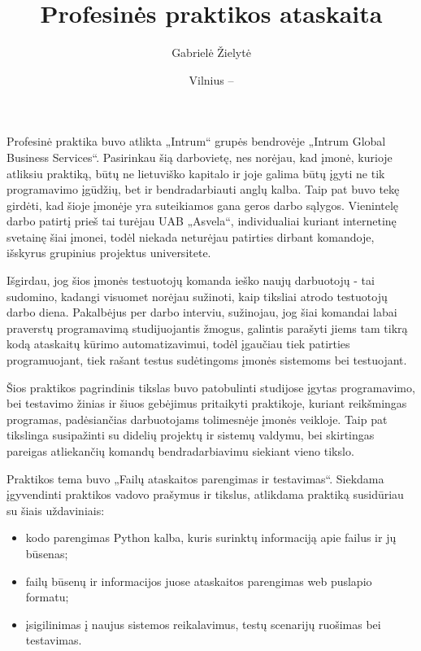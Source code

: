 \documentclass{VUMIFPSkursinis}
\title{Profesinės praktikos ataskaita}
\author{Gabrielė Žielytė}
\date{Vilnius – \the\year}
\begin{document}
\maketitle

\setcounter{page}{2}

\tableofcontents


Profesinė praktika buvo atlikta „Intrum“ grupės bendrovėje „Intrum Global Business Services“. Pasirinkau šią darbovietę, nes norėjau, kad įmonė, kurioje atliksiu praktiką, būtų ne lietuviško kapitalo ir joje galima būtų įgyti ne tik programavimo įgūdžių, bet ir bendradarbiauti anglų kalba. Taip pat buvo tekę girdėti, kad šioje įmonėje yra suteikiamos gana geros darbo sąlygos. Vienintelę darbo patirtį prieš tai turėjau UAB „Asvela“, individualiai kuriant internetinę svetainę šiai įmonei, todėl niekada neturėjau patirties dirbant komandoje, išskyrus grupinius projektus universitete.

Išgirdau, jog šios įmonės testuotojų komanda ieško naujų darbuotojų - tai sudomino, kadangi visuomet norėjau sužinoti, kaip tiksliai atrodo testuotojų darbo diena. Pakalbėjus per darbo interviu, sužinojau, jog šiai komandai labai praverstų programavimą studijuojantis žmogus, galintis parašyti jiems tam tikrą kodą ataskaitų kūrimo automatizavimui, todėl įgaučiau tiek patirties programuojant, tiek rašant testus sudėtingoms įmonės sistemoms bei testuojant. 

Šios praktikos pagrindinis tikslas buvo patobulinti studijose įgytas programavimo, bei testavimo žinias ir šiuos gebėjimus pritaikyti praktikoje, kuriant reikšmingas programas, padėsiančias darbuotojams tolimesnėje įmonės veikloje. Taip pat tikslinga susipažinti su didelių projektų ir sistemų valdymu, bei skirtingas pareigas atliekančių komandų bendradarbiavimu siekiant vieno tikslo.

Praktikos tema buvo „Failų ataskaitos parengimas ir testavimas“. Siekdama įgyvendinti praktikos vadovo prašymus ir tikslus, atlikdama praktiką susidūriau su šiais uždaviniais:
\begin{itemize}
    \item kodo parengimas Python kalba, kuris surinktų informaciją apie failus ir jų būsenas;
    \item failų būsenų ir informacijos juose ataskaitos parengimas web puslapio formatu;
    \item įsigilinimas į naujus sistemos reikalavimus, testų scenarijų ruošimas bei testavimas.
\end{itemize} 
\end{document}
